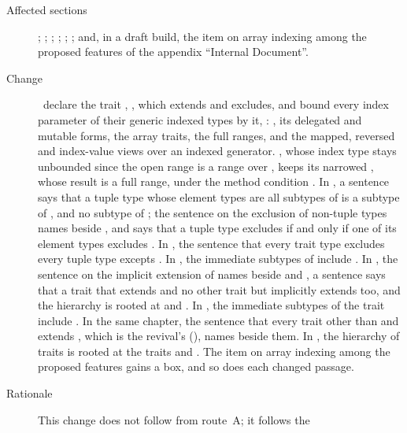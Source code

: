 \begin{description}
\item[Affected sections] ; ;
; ; ;
; and, in a draft build, the item on
array indexing among the proposed features of the appendix ``Internal
Document''.
\item[Change] \library\ declare the trait ,
, which
 extends and  excludes, and bound every index
parameter of their generic indexed types by it,
: , its delegated and mutable
forms, the array traits, the full ranges, and the mapped, reversed and
index-value views over an indexed generator.
, whose index type stays unbounded since the open range
\EXP{(:)} is a range over , keeps its narrowed , whose
result is a full range, under the method condition
.
In , a sentence says that a tuple type whose element types
are all subtypes of  is a subtype of , and no subtype of
; the sentence on the exclusion of non-tuple types names
 beside , and says that a tuple type excludes 
if and only if one of its element types excludes .
In , the sentence that every trait type excludes every
tuple type excepts .
In , the immediate subtypes of  include
.
In , the sentence on the implicit extension of
 names  beside  and , a sentence
says that a trait that extends  and no other trait but 
implicitly extends  too, and the hierarchy is rooted at
 and .
In , the immediate subtypes of the trait  include
.
In the same chapter, the sentence that every trait other than  and
 extends , which is the revival's
(), names  beside them.
In , the hierarchy of traits is rooted at the
traits  and .
The item on array indexing among the proposed features gains a box, and so
does each changed passage.
\item[Rationale] This change does not follow from route~A; it follows the

\end{description}
